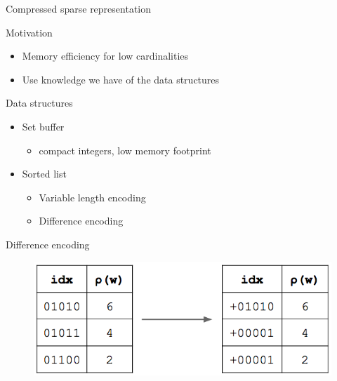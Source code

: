 \documentclass{beamer}
\begin{document}


\begin{frame}{Compressed sparse representation}


\begin{block}{Motivation}
\begin{itemize}
\item Memory efficiency for low cardinalities
\item Use knowledge we have of the data structures
\end{itemize}
\end{block}


\begin{block}{Data structures}
\begin{itemize}
\item Set buffer
  \begin{itemize}
  \item compact integers, low memory footprint
  \end{itemize}
\item Sorted list
  \begin{itemize}
  \item Variable length encoding
  \item Difference encoding
  \end{itemize}
\end{itemize}
\end{block}


\end{frame}



\begin{frame}{Difference encoding}

\begin{figure}[c]
\includegraphics [scale=0.5]  {hyperloglog_difference.png}

\end{figure}


\end{frame}
\end{document}
